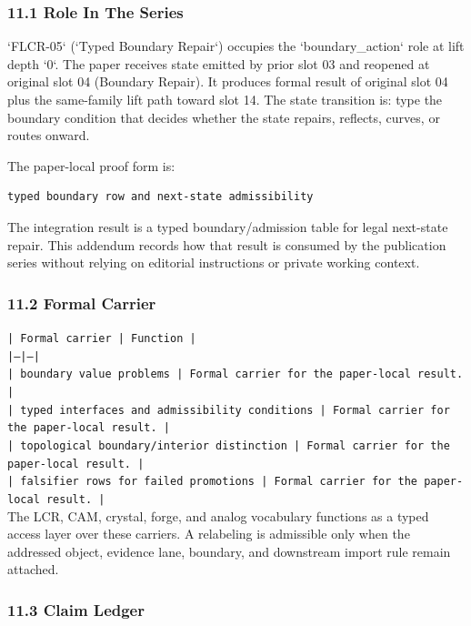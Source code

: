 \documentclass[11pt]{article}
\begin{document}
\subsubsection*{11.1 Role In The Series}

`FLCR-05` (`Typed Boundary Repair`) occupies the `boundary\_action` role at lift depth `0`.
The paper receives state emitted by prior slot 03 and reopened at original slot 04 (Boundary Repair). It produces formal result of original slot 04 plus the same-family lift path toward slot 14. The state transition is:
type the boundary condition that decides whether the state repairs, reflects, curves, or routes onward.

The paper-local proof form is:

\begin{verbatim}
typed boundary row and next-state admissibility
\end{verbatim}

The integration result is a typed boundary/admission table for legal next-state repair. This addendum records how that result is
consumed by the publication series without relying on editorial instructions or
private working context.

\subsubsection*{11.2 Formal Carrier}

\noindent\texttt{| Formal carrier | Function |}\\
\noindent\texttt{|---|---|}\\
\noindent\texttt{| boundary value problems | Formal carrier for the paper-local result. |}\\
\noindent\texttt{| typed interfaces and admissibility conditions | Formal carrier for the paper-local result. |}\\
\noindent\texttt{| topological boundary/interior distinction | Formal carrier for the paper-local result. |}\\
\noindent\texttt{| falsifier rows for failed promotions | Formal carrier for the paper-local result. |}\\

The LCR, CAM, crystal, forge, and analog vocabulary functions as a typed access
layer over these carriers. A relabeling is admissible only when the addressed
object, evidence lane, boundary, and downstream import rule remain attached.

\subsubsection*{11.3 Claim Ledger}
\end{document}
